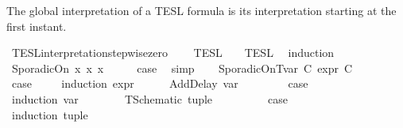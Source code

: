 \begin{isabellebody}
{\isafoldproof}%
%
\isadelimproof
%
\endisadelimproof
%
\begin{isamarkuptext}%
The global interpretation of a TESL formula is its interpretation starting
  at the first instant.%
\end{isamarkuptext}\isamarkuptrue%
\isamarkupfalse%
\ TESL{\isacharunderscore}interpretation{\isacharunderscore}stepwise{\isacharunderscore}zero{\isacharcolon}\isanewline
\ \ {\isacartoucheopen}{\isasymlbrakk}\ {\isasymphi}\ {\isasymrbrakk}\isactrlsub T\isactrlsub E\isactrlsub S\isactrlsub L\ {\isacharequal}\ {\isasymlbrakk}\ {\isasymphi}\ {\isasymrbrakk}\isactrlsub T\isactrlsub E\isactrlsub S\isactrlsub L\isactrlbsup {\isasymge}\ {}\isactrlesup {\isacartoucheclose}\isanewline
%
\isadelimproof
%
\endisadelimproof
%
\isatagproof
{}\isamarkupfalse%
\ {\isacharparenleft}induction\ {\isasymphi}{\isacharparenright}\isanewline
{}\isamarkupfalse%
\ {\isacharparenleft}SporadicOn\ x{}\ x{}\ x{}{\isacharparenright}\isanewline
\ \ \isamarkupfalse%
\ \isamarkupfalse%
\ {\isacharquery}case\ \isamarkupfalse%
\ simp\isanewline
{}\isamarkupfalse%
\isanewline
\ \ \isamarkupfalse%
\ {\isacharparenleft}SporadicOnTvar\ C\ {\isasymtau}\isactrlsub e\isactrlsub x\isactrlsub p\isactrlsub r\ C\isanewline
\ \ \isamarkupfalse%
\ \isamarkupfalse%
\ {\isacharquery}case\ \isanewline
\ \ \isamarkupfalse%
\ {\isacharparenleft}induction\ {\isasymtau}\isactrlsub e\isactrlsub x\isactrlsub p\isactrlsub r{\isacharparenright}\isanewline
\ \ \ \ \isamarkupfalse%
\ {\isacharparenleft}AddDelay\ {\isasymtau}\isactrlsub v\isactrlsub a\isactrlsub r\ {\isasymdelta}{\isasymtau}{\isacharparenright}\isanewline
\ \ \ \ \isamarkupfalse%
\ \isamarkupfalse%
\ {\isacharquery}case\isanewline
\ \ \ \ \isamarkupfalse%
\ {\isacharparenleft}induction\ {\isasymtau}\isactrlsub v\isactrlsub a\isactrlsub r\isanewline
\ \ \ \ \ \ \isamarkupfalse%
\ {\isacharparenleft}TSchematic\ tuple{\isacharparenright}\isanewline
\ \ \ \ \ \ \isamarkupfalse%
\ \isamarkupfalse%
\ {\isacharquery}case\isanewline
\ \ \ \ \ \ \isamarkupfalse%
\ {\isacharparenleft}induction\ tuple{\isacharparenright}\isanewline

\end{isabellebody}
